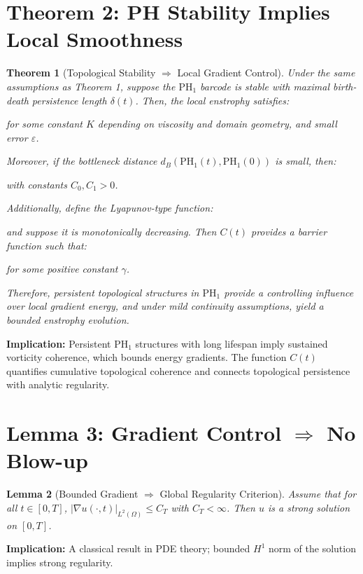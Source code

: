 \documentclass[11pt]{article}
\newtheorem{theorem}{Theorem}[section]
\newtheorem{lemma}[theorem]{Lemma}
\begin{document}
\section{Theorem 2: PH Stability Implies Local Smoothness}
\begin{theorem}[Topological Stability $\Rightarrow$ Local Gradient Control]
Under the same assumptions as Theorem 1, suppose the $\mathrm{PH}_1$ barcode is stable with maximal birth-death persistence length $\delta(t)$. Then, the local enstrophy satisfies:



for some constant $K$ depending on viscosity and domain geometry, and small error $\varepsilon$.

Moreover, if the bottleneck distance $d_B(\mathrm{PH}_1(t), \mathrm{PH}_1(0))$ is small, then:



with constants $C_0, C_1 > 0$.

Additionally, define the Lyapunov-type function:



and suppose it is monotonically decreasing. Then $C(t)$ provides a barrier function such that:



for some positive constant $\gamma$.

Therefore, persistent topological structures in $\mathrm{PH}_1$ provide a controlling influence over local gradient energy, and under mild continuity assumptions, yield a bounded enstrophy evolution.
\end{theorem}

\textbf{Implication:} Persistent $\mathrm{PH}_1$ structures with long lifespan imply sustained vorticity coherence, which bounds energy gradients. The function $C(t)$ quantifies cumulative topological coherence and connects topological persistence with analytic regularity.

\section{Lemma 3: Gradient Control $\Rightarrow$ No Blow-up}
\begin{lemma}[Bounded Gradient $\Rightarrow$ Global Regularity Criterion]
Assume that for all $t \in [0,T]$, $|\nabla u(\cdot,t)|_{L^2(\Omega)} \leq C_T$ with $C_T < \infty$. Then $u$ is a strong solution on $[0,T]$.
\end{lemma}

\textbf{Implication:} A classical result in PDE theory; bounded $H^1$ norm of the solution implies strong regularity.
\end{document}
